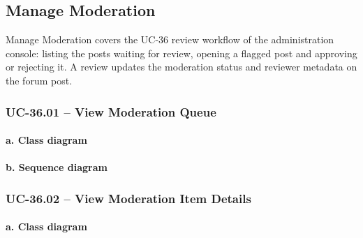 

\subsection{Manage Moderation}

Manage Moderation covers the UC-36 review workflow of the administration
console: listing the posts waiting for review, opening a flagged post and
approving or rejecting it. A review updates the moderation status and reviewer
metadata on the forum post.

\subsubsection{UC-36.01 -- View Moderation Queue}

\paragraph*{a. Class diagram}

\paragraph*{b. Sequence diagram}

\subsubsection{UC-36.02 -- View Moderation Item Details}

\paragraph*{a. Class diagram}

